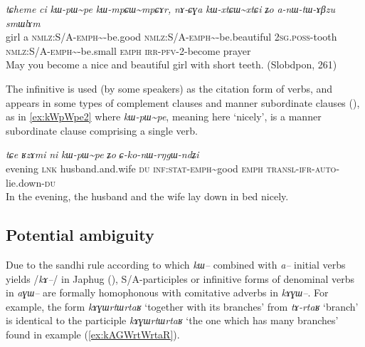 \documentclass[oldfontcommands,oneside,a4paper,11pt]{article}
\newcommand{\ipa}[1]{{\phon\textit{#1}}} %
\newcommand{\tld}{\textasciitilde{}}
\begin{document}
\begin{exe}
\ex \label{ex:kWpWpe}
\gll
\ipa{tɕheme} 	\ipa{ci} 	\ipa{kɯ-pɯ\tld{}pe} 	\ipa{kɯ-mpɕɯ\tld{}mpɕɤr,} 	\ipa{nɤ-ɕɣa} 	\ipa{kɯ-xtɕɯ\tld{}xtɕi} 	\ipa{ʑo} 	\ipa{a-nɯ-tɯ-ɤβzu} 	\ipa{smɯlɤm}  \\
girl a \textsc{nmlz:S/A-emph}\tld{}-be.good \textsc{nmlz:S/A-emph}\tld{}-be.beautiful  \textsc{2sg.poss}-tooth \textsc{nmlz:S/A-emph}\tld{}-be.small \textsc{emph} \textsc{irr-pfv}-2-become prayer \\
\glt May you become a nice and beautiful girl with short teeth. (Slobdpon, 261)
\end{exe}

The infinitive is used (by some speakers) as the citation form of verbs, and appears in some types of complement clauses and manner subordinate clauses (\citealt[271-2; 321-5]{jacques14linking}), as in \ref{ex:kWpWpe2} where \ipa{kɯ-pɯ\tld{}pe}, meaning here `nicely', is a manner subordinate clause comprising a single verb.
 \begin{exe}
\ex \label{ex:kWpWpe2}
\gll \ipa{ɕɤr} 	\ipa{tɕe} 	\ipa{ʁzɤmi} 	\ipa{ni} 	\ipa{kɯ-pɯ\tld{}pe} 	\ipa{ʑo} 	\ipa{ɕ-ko-nɯ-rŋgɯ-ndʑi}  \\
evening \textsc{lnk} husband.and.wife \textsc{du} \textsc{inf:stat-emph}\tld{}good \textsc{emph} \textsc{transl-ifr-auto}-lie.down-\textsc{du} \\
\glt In the evening, the husband and the wife lay down in bed nicely.
\end{exe}


\subsection{Potential ambiguity}
Due to the sandhi rule according to which \ipa{kɯ--} combined with \ipa{a--} initial verbs yields /\ipa{kɤ--}/ in Japhug (\citealt{jacques04these}), S/A-participles or infinitive forms of denominal verbs in \ipa{aɣɯ--} are formally homophonous with comitative adverbs in \ipa{kɤɣɯ--}. For example, the form \ipa{kɤɣɯrtɯrtaʁ}  `together with its branches' from \ipa{tɤ-rtaʁ} `branch' is identical to the participle \ipa{kɤɣɯrtɯrtaʁ} `the one which has many branches' found in example (\ref{ex:kAGWrtWrtaR}).
\end{document}
